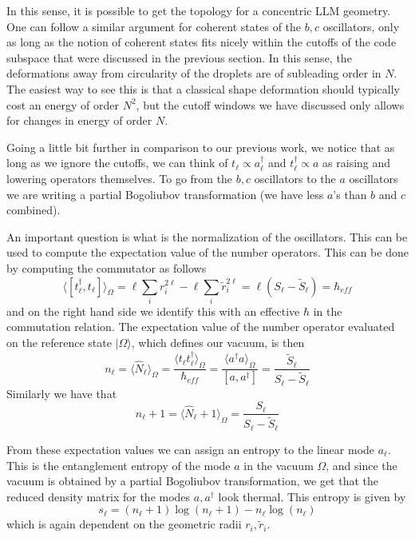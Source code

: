 \documentclass[12pt,nofootinbib, longbibliography]{revtex4-1}
\newcommand\vev[1]{\langle #1\rangle}
\newcommand\ket[1]{| #1\rangle}
\begin{document}
In this sense, it is possible to get the topology for a concentric LLM geometry. One can follow a similar argument for coherent states of the $b,c$ oscillators, only as long as the notion of coherent states fits nicely within the cutoffs of the code subspace that were discussed in the previous section. In this sense, the deformations away from circularity of the droplets are of subleading order  in $N$. The easiest way to see this is that a classical shape deformation should typically cost an energy of order $N^2$, but the cutoff windows we have discussed  only allows for changes in energy of order $N$. 

Going a little bit further in comparison to our previous work, we notice that as long as we ignore the cutoffs, we can think of $t_\ell\propto a^\dagger_\ell$ and $t_\ell^\dagger\propto a$ as raising and lowering operators themselves. To go from the $b,c$ oscillators to the $a$ oscillators we are writing a partial Bogoliubov transformation (we have less $a$'s than $b$ and $c$ combined).

An important question is what is the normalization of the oscillators. This can be used to compute the expectation value of the number operators. This can be done by computing the commutator as follows
\begin{equation}
\vev{[t_\ell^\dagger, t_\ell]}_{\Omega} = \ell \sum_i r_i^{2\ell}- \ell  \sum_i \tilde r_i^{2\ell}=\ell(S_\ell-\tilde S_\ell)=\hbar_{eff}
\end{equation}
and on the right hand side we identify this with an effective $\hbar$ in the commutation relation. The expectation value of the number operator evaluated on the reference state $\ket \Omega$, which defines our vacuum,  is then
\begin{equation}
n_\ell=\vev{\hat N_{\ell}}_{\Omega} = \frac{\vev{t_\ell t_\ell^\dagger}_{\Omega}}{\hbar_{eff}}= \frac{\vev{a^\dagger a}_{\Omega}}{[a,a^\dagger]}=\frac{\tilde S_{\ell}}{S_\ell-\tilde S_\ell}
\end{equation}
Similarly we have that 
\begin{equation}
n_{\ell}+1=\vev{\hat N_{\ell}+1}_{\Omega}= \frac{S_{\ell}}{S_\ell-\tilde S_\ell}
\end{equation}

From these expectation values we can assign an entropy to the linear mode $a_\ell$. This is the entanglement entropy of the mode $a$ in the vacuum $\Omega$, and since the vacuum is obtained by a partial Bogoliubov transformation, we get that the reduced density matrix for the modes $a, a^\dagger$ look thermal. This entropy is given by
\begin{equation}
s_\ell = (n_{\ell}+1)\log(n_{\ell}+1)-n_{\ell} \log(n_\ell)
\end{equation}
which is again dependent on the geometric radii $r_i, \tilde r_i$. 
\end{document}
